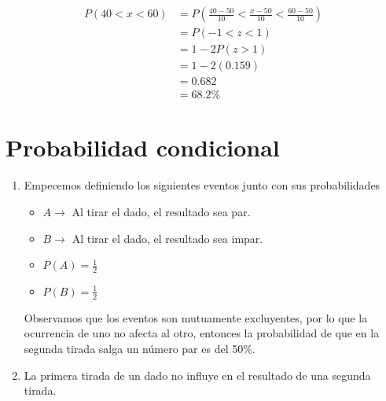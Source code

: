 \documentclass[12pt, letterpaper]{article}
\begin{document}
\begin{enumerate}
\begin{equation*}
    \end{equation*}
    \begin{equation*}
        \begin{aligned}
            P(40 < x < 60)
            & = P(\frac{40-50}{10} < \frac{x-50}{10} < \frac{60-50}{10}) \\
            & = P(-1 < z < 1) \\
            & = 1 - 2P(z > 1) \\
            & = 1 - 2(0.159) \\
            & = 0.682 \\
            & = 68.2\%
        \end{aligned}
    \end{equation*}
\end{enumerate}

\newpage

\section{Probabilidad condicional}
\begin{enumerate}
    \item Empecemos definiendo los siguientes eventos junto con sus probabilidades
    \begin{itemize}
        \item $A \rightarrow $ Al tirar el dado, el resultado sea par.
        \item $B \rightarrow $ Al tirar el dado, el resultado sea impar.
        \item $P(A) = \frac{1}{2}$
        \item $P(B) = \frac{1}{2}$
    \end{itemize}
    Observamos que los eventos son mutuamente excluyentes, por lo que la ocurrencia de uno no afecta al otro, entonces la probabilidad de que en la segunda tirada salga un número par es del 50\%.
    \item La primera tirada de un dado no influye en el resultado de una segunda tirada.
\end{enumerate}
\end{document}
